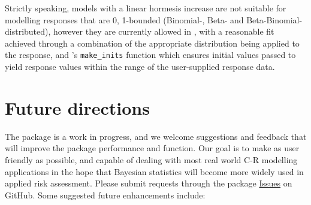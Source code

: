 Strictly speaking, models with a linear hormesis increase are not
suitable for modelling responses that are 0, 1-bounded (Binomial-, Beta-
and Beta-Binomial-distributed), however they are currently allowed in
, with a reasonable fit achieved through a combination of
the appropriate distribution being applied to the response, and
's \texttt{make\_inits} function which ensures initial
values passed to  yield response values within the range of
the user-supplied response data.

\hypertarget{future-directions}{%
\section{Future directions}\label{future-directions}}

The  package is a work in progress, and we welcome
suggestions and feedback that will improve the package performance and
function. Our goal is to make  as user friendly as
possible, and capable of dealing with most real world C-R modelling
applications in the hope that Bayesian statistics will become more
widely used in applied risk assessment. Please submit requests through
the package \href{https://github.com/open-AIMS/bayesnec/issues}{Issues}
on GitHub. Some suggested future enhancements include:

